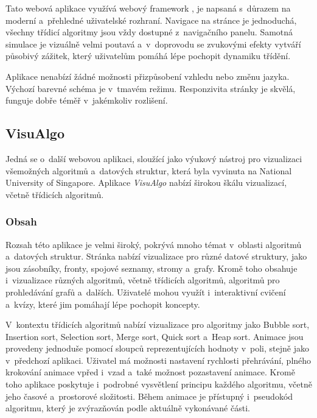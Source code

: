 Tato webová aplikace využívá webový framework , je napsaná s~důrazem na moderní a~přehledné uživatelské rozhraní.
Navigace na stránce je jednoduchá, všechny třídicí algoritmy jsou vždy dostupné z~navigačního panelu.
Samotná simulace je vizuálně velmi poutavá a~v~doprovodu se zvukovými efekty vytváří působivý zážitek, který uživatelům pomáhá lépe pochopit dynamiku třídění.

Aplikace nenabízí žádné možnosti přizpůsobení vzhledu nebo změnu jazyka.
Výchozí barevné schéma je v~tmavém režimu.
Responzivita stránky je skvělá, funguje dobře téměř v~jakémkoliv rozlišení.

\subsection{VisuAlgo}
\label{subsec:other_apps_sa_visualgo}

Jedná se o~další webovou aplikaci, sloužící jako výukový nástroj pro vizualizaci všemožných algoritmů a~datových struktur, která byla vyvinuta na National University of Singapore.
Aplikace \textit{VisuAlgo} nabízí širokou škálu vizualizací, včetně třídicích algoritmů.~\cite{visualgo}

\subsubsection*{Obsah}

Rozsah této aplikace je velmi široký, pokrývá mnoho témat v~oblasti algoritmů a~datových struktur.
Stránka nabízí vizualizace pro různé datové struktury, jako jsou zásobníky, fronty, spojové seznamy, stromy a~grafy.
Kromě toho obsahuje i~vizualizace různých algoritmů, včetně třídicích algoritmů, algoritmů pro prohledávání grafů a~dalších.
Uživatelé mohou využít i~interaktivní cvičení a~kvízy, které jim pomáhají lépe pochopit koncepty.

V~kontextu třídicích algoritmů nabízí vizualizace pro algoritmy jako Bubble sort, Insertion sort, Selection sort, Merge sort, Quick sort a~Heap sort.
Animace jsou provedeny jednoduše pomocí sloupců reprezentujících hodnoty v~poli, stejně jako v~předchozí aplikaci.
Uživatel má možnosti nastavení rychlosti přehrávání, plného krokování animace vpřed i~vzad a~také možnost pozastavení animace.
Kromě toho aplikace poskytuje i~podrobné vysvětlení principu každého algoritmu, včetně jeho časové a~prostorové složitosti.
Během animace je přístupný i~pseudokód algoritmu, který je zvýrazňován podle aktuálně vykonávané části.

